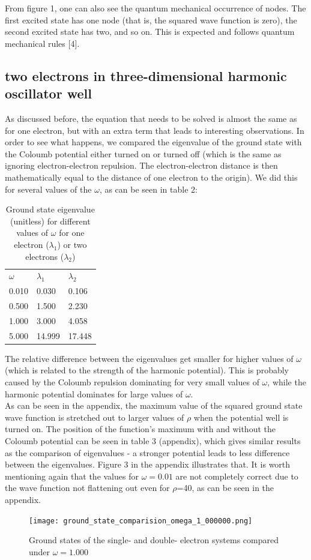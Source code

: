 \documentclass[10pt,a4paper]{article}
\begin{document}
From figure 1, one can also see the quantum mechanical occurrence of nodes. The first excited state has one node (that is, the squared wave function is zero), the second excited state has two, and so on. This is expected and follows quantum mechanical rules [4].
 
\subsection{two electrons in three-dimensional harmonic oscillator well}
As discussed before, the equation that needs to be solved is almost the same as for one electron, but with an extra term that leads to interesting observations. In order to see what happens, we compared the eigenvalue of the ground state with the Coloumb potential either turned on or turned off (which is the same as ignoring electron-electron repulsion. The electron-electron distance is then mathematically equal to the distance of one electron to the origin). We did this for several values of the  $\omega$, as can be seen in table 2:
\begin{table}[H]
\caption[Ground state eigenvalues for one and two electrons]{Ground state eigenvalue (unitless) for different values of $\omega$ for one electron ($\lambda_1$) or two electrons ($\lambda_2$)}
\begin{tabular}{lll}
$\omega$ &$\lambda_1$ & $\lambda_2$  \\
0.010 & 0.030 & 0.106 \\
0.500 &1.500 & 2.230 \\
1.000 &3.000 & 4.058  \\
5.000 &14.999 & 17.448\\
\end{tabular}
\end{table}
The relative difference between the eigenvalues get smaller for higher values of $\omega$ (which is related to the strength of the harmonic potential). This is probably caused by the Coloumb repulsion dominating for very small values of $\omega$, while the harmonic potential dominates for large values of $\omega$. \\
As can be seen in the appendix, the maximum value of the squared ground state wave function is stretched out to larger values of $\rho$ when the potential well is turned on. The position of the function's maximum with and without the Coloumb potential can be seen in table 3 (appendix), which gives similar results as the comparison of eigenvalues - a stronger potential leads to less difference between the eigenvalues. Figure 3 in the appendix illustrates that. It is worth mentioning again that the values for $\omega=0.01$ are not completely correct due to the wave function not flattening out even for $\rho$=40, as can be seen in the appendix.
\begin{figure}[H]
	\texttt{[image: ground\_state\_comparision\_omega\_1\_000000.png]}
	\caption[Ground states of the single- and double- electron systems]{Ground states of the single- and double- electron systems compared under $\omega =1.000$}
\end{figure}
\end{document}
